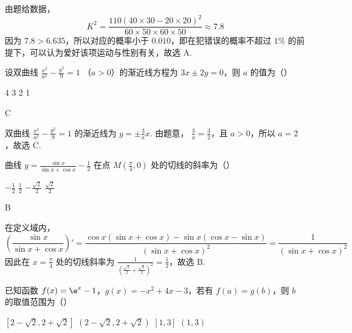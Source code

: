 \begin{solution}
由题给数据，
\[
K^2=\frac{110(40\times30-20\times20)^2}{60\times50\times60\times50}\approx7.8
\]
因为 \(7.8>6.635\)，所以对应的概率小于 \(0.010\)，即在犯错误的概率不超过 \(1\%\) 的前提下，可以认为爱好该项运动与性别有关，故选 A.
\end{solution}

\begin{problem}
设双曲线 \(\frac{x^2}{a^2} - \frac{y^2}{9} = 1 \) （\(a > 0\)）的渐近线方程为 \(3x \pm 2y = 0\)，则 \(a\) 的值为（\quad）

\choices
    {4}
    {3}
    {2}
    {1}
\end{problem}

\begin{answer}
C
\end{answer}

\begin{solution}
双曲线
\(\frac{x^2}{a^2}-\frac{y^2}{9}=1\) 的渐近线为
\(y=\pm\frac{3}{a}x\). 由题意，
\(\frac{3}{a}=\frac32\)，且 \(a>0\)，所以 \(a=2\)，故选 C.
\end{solution}

\begin{problem}
曲线 \( y = \frac{\sin x}{\sin x + \cos x} - \frac{1}{2} \) 在点 \( M\left(\frac{\pi}{4}, 0\right) \) 处的切线的斜率为（\quad）

\choices
    {\(-\frac{1}{2}\)}
    {\( \frac{1}{2} \)}
    {\( -\frac{\sqrt{2}}{2} \)}
    {\( \frac{\sqrt{2}}{2} \)}
\end{problem}

\begin{answer}
B
\end{answer}

\begin{solution}
在定义域内，
\[
\left(\frac{\sin x}{\sin x+\cos x}\right)'
=\frac{\cos x(\sin x+\cos x)-\sin x(\cos x-\sin x)}{(\sin x+\cos x)^2}
=\frac{1}{(\sin x+\cos x)^2}
\]
因此在 \(x=\frac\pi4\) 处的切线斜率为
\(\frac{1}{(\frac{\sqrt2}{2}+\frac{\sqrt2}{2})^2}=\frac12\)，故选 B.
\end{solution}

\begin{problem}
已知函数 \(f(x) = \e^{x} - 1\)，\(g(x) = -x^{2} + 4x - 3\)，若有 \( f(a) = g(b) \)，则 \( b \) 的取值范围为（\quad）

\choices
    {\([2 - \sqrt{2}, 2 + \sqrt{2}]\)}
    {\((2 - \sqrt{2}, 2 + \sqrt{2})\)}
    {\([1,3]\)}
    {\((1,3)\)}
\end{problem}

